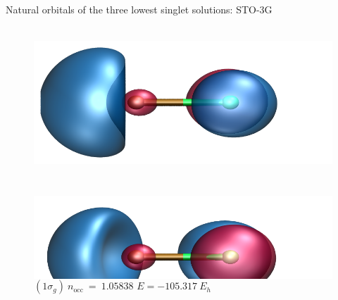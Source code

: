 \documentclass[10pt]{beamer}
\begin{document}
\begin{frame}{Natural orbitals of the three lowest singlet solutions:  STO-3G}
\begin{figure}
\begin{columns}[b]
      \begin{column}{0.31\textwidth}
        \includegraphics[height=0.6\textwidth]{Figures/lifr3_s1_mo7.cube.png}
        \caption*{\centering $(1\sigma_u)~n_\text{occ}~=~0.94162$}
        \includegraphics[height=0.6\textwidth]{Figures/lifr3_s1_mo6.cube.png}
        \caption*{\centering $(1\sigma_g)~n_\text{occ}~=~1.05838$
        $E=-105.317~E_h$}
      \end{column}


\end{columns}
\end{figure}
\end{frame}
\end{document}
